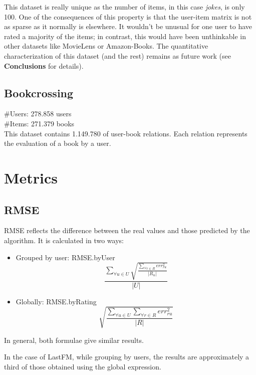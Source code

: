 \documentclass[a4paper]{article}
\begin{document}
This dataset is really unique as the number of items, in this case \textit{jokes}, is only 100. One of the consequences of this property is that the user-item matrix is not as sparse as it normally is elsewhere. It wouldn't be unusual for one user to have rated a majority of the items; in contrast, this would have been unthinkable in other datasets like MovieLens or Amazon-Books. The quantitative characterization of this dataset (and the rest) remains as future work (see \textbf{Conclusions} for details).

\subsection{Bookcrossing}
\#Users: 278.858 users \\
\#Items: 271.379 books \\
This dataset contains 1.149.780 of user-book relations. Each relation represents the evaluation of a book by a user. 

\section{Metrics}
\subsection{RMSE}
RMSE reflects the difference between the real values and those predicted by the algorithm.
It is calculated in two ways:
\begin{itemize}
	\item Grouped by user: RMSE.byUser
	\begin{equation}
		\frac{\displaystyle\sum_{\forall u\in U}\sqrt{\frac{\displaystyle\sum_{\forall r \in R} err_{ru}^2}{|R_u|}}}{|U|}
    \end{equation}
    \item Globally: RMSE.byRating 
	\begin{equation}
		\sqrt{\frac{\displaystyle\sum_{\forall u \in U}\displaystyle\sum_{\forall r \in R} err_{ru}^2}{|R|}}
    \end{equation}
\end {itemize}

In general, both formulae give similar results.

In the case of LastFM, while grouping by users, the results are approximately a third of those obtained using the global expression.

\end{document}

